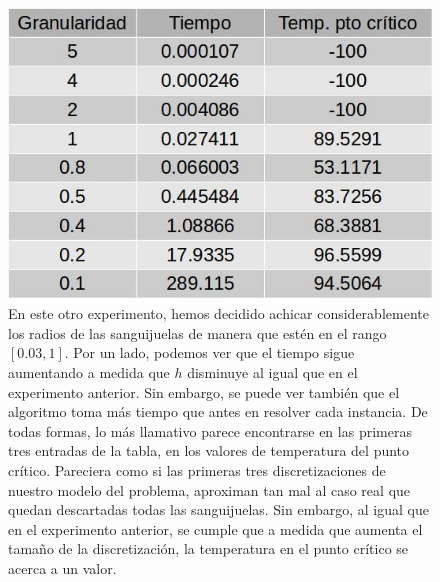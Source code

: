 \begin{figure}[H]
\centering
\includegraphics[scale=0.4]{../../Experimentos/Experimento2/instancia20x20_2.jpg}\caption{En este otro experimento, hemos decidido achicar considerablemente los radios de las sanguijuelas de manera que estén en el rango $[0.03, 1]$. Por un lado, podemos ver que el tiempo sigue aumentando a medida que $h$ disminuye al igual que en el experimento anterior. Sin embargo, se puede ver también que el algoritmo toma más tiempo que antes en resolver cada instancia. De todas formas, lo más llamativo parece encontrarse en las primeras tres entradas de la tabla, en los valores de temperatura del punto crítico. Pareciera como si las primeras tres discretizaciones de nuestro modelo del problema, aproximan tan mal al caso real que quedan descartadas todas las sanguijuelas. Sin embargo, al igual que en el experimento anterior, se cumple que a medida que aumenta el tamaño de la discretización, la temperatura en el punto crítico se acerca a un valor.}
\end{figure}

